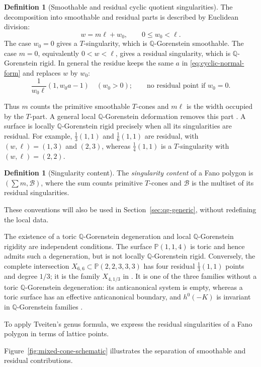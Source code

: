 \documentclass[11pt]{article}
\theoremstyle{plain}
\theoremstyle{definition}
\newtheorem{definition}[theorem]{Definition}
\theoremstyle{remark}
\newcommand{\Q}{\mathbb Q}
\newcommand{\Pj}{\mathbb P}
\newcommand{\1}{\mathbf 1}
\begin{document}
\begin{definition}[Smoothable and residual cyclic quotient singularities]
The decomposition into smoothable and residual parts is described by Euclidean division:
\[
w=m\ell+w_0,
\qquad 0\le w_0<\ell.
\]
The case $w_0=0$ gives a $T$-singularity, which is $\Q$-Gorenstein smoothable.  The case $m=0$, equivalently $0<w<\ell$, gives a residual singularity, which is $\Q$-Gorenstein rigid.  In general the residue keeps the same $a$ in \eqref{eq:cyclic-normal-form} and replaces $w$ by $w_0$:
\[
\frac1{w_0\ell}(1,w_0a-1)\quad(w_0>0);
\qquad\text{no residual point if }w_0=0.
\]
\end{definition}
Thus $m$ counts the primitive smoothable $T$-cones and $m\ell$ is the width occupied by the $T$-part.  A general local $\Q$-Gorenstein deformation removes this part \cite[Basic Concepts]{ACC+}.  A surface is locally $\Q$-Gorenstein rigid precisely when all its singularities are residual.  For example, $\frac13(1,1)$ and $\frac16(1,1)$ are residual, with $(w,\ell)=(1,3)$ and $(2,3)$, whereas $\frac14(1,1)$ is a $T$-singularity with $(w,\ell)=(2,2)$.

\begin{definition}[Singularity content]
The \emph{singularity content} of a Fano polygon is $(\sum m,\mathcal B)$, where the sum counts primitive $T$-cones and $\mathcal B$ is the multiset of its residual singularities.
\end{definition}

These conventions will also be used in Section~\ref{sec:qg-generic}, without redefining the local data.

The existence of a toric $\Q$-Gorenstein degeneration and local $\Q$-Gorenstein rigidity are independent conditions.  The surface $\Pj(1,1,4)$ is toric and hence admits such a degeneration, but is not locally $\Q$-Gorenstein rigid.  Conversely, the complete intersection $X_{6,6}\subset\Pj(2,2,3,3,3)$ has four residual $\frac13(1,1)$ points and degree $1/3$; it is the family $X_{4,1/3}$ in \cite[Section 7.6, entry 25]{OP}.  It is one of the three families without a toric $\Q$-Gorenstein degeneration: its anticanonical system is empty, whereas a toric surface has an effective anticanonical boundary, and $h^0(-K)$ is invariant in $\Q$-Gorenstein families \cite[Section 7]{CH}.

To apply Tveiten's genus formula, we express the residual singularities of a Fano polygon in terms of lattice points.

Figure~\ref{fig:mixed-cone-schematic} illustrates the separation of smoothable and residual contributions.
\end{document}
